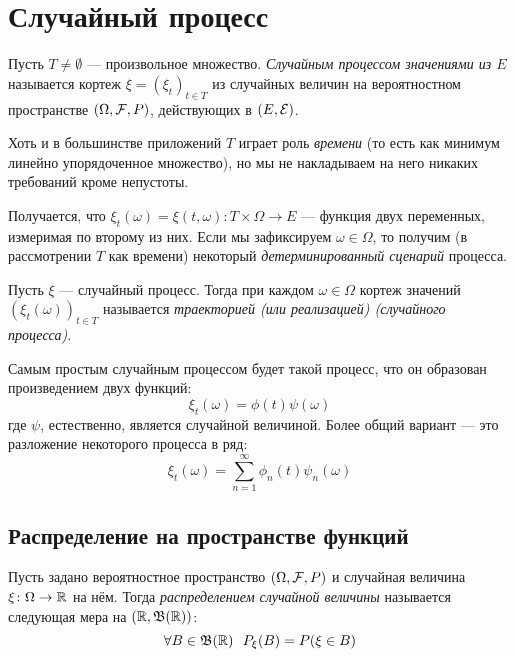 \section{Случайный процесс}

\begin{definition}
	Пусть $T \neq \emptyset$ --- произвольное множество. \textit{Случайным процессом значениями из $E$} называется кортеж $\xi = (\xi_t)_{t \in T}$ из случайных величин на вероятностном пространстве $(\Omega, \mathcal{F}, P)$, действующих в $(E, \mathcal{E})$.
\end{definition}

\begin{note}
	Хоть и в большинстве приложений $T$ играет роль \textit{времени} (то есть как минимум линейно упорядоченное множество), но мы не накладываем на него никаких требований кроме непустоты.
\end{note}

\begin{note}
	Получается, что $\xi_t(\omega) = \xi(t, \omega) \colon T \times \Omega \to E$ --- функция двух переменных, измеримая по второму из них. Если мы зафиксируем $\omega \in \Omega$, то получим (в рассмотрении $T$ как времени) некоторый \textit{детерминированный сценарий} процесса.
\end{note}

\begin{definition}
	Пусть $\xi$ --- случайный процесс. Тогда при каждом $\omega \in \Omega$ кортеж значений $(\xi_t(\omega))_{t \in T}$ называется \textit{траекторией (или реализацией) (случайного процесса)}.
\end{definition}

\begin{example}
	Самым простым случайным процессом будет такой процесс, что он образован произведением двух функций:
	\[
		\xi_t(\omega) = \phi(t)\psi(\omega)
	\]
	где $\psi$, естественно, является случайной величиной. Более общий вариант --- это разложение некоторого процесса в ряд:
	\[
		\xi_t(\omega) = \sum_{n = 1}^\infty \phi_n(t)\psi_n(\omega)
	\]
\end{example}

\subsection{Распределение на пространстве функций}

\begin{reminder}
	Пусть задано вероятностное пространство $(\Omega, \mathcal{F}, P)$ и случайная величина $\xi \colon \Omega \to \mathbb{R}$ на нём. Тогда \textit{распределением случайной величины} называется следующая мера на $(\mathbb{R}, \mathfrak{B}(\mathbb{R}))$:
	\[
	\forall B \in \mathfrak{B}(\mathbb{R})\ \ P_\xi(B) = P(\xi \in B)
	\]
\end{reminder}

